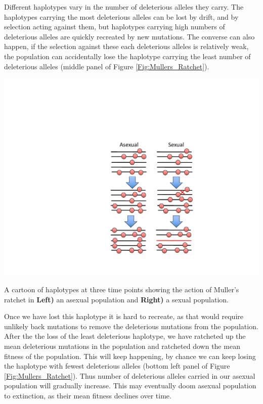 Different haplotypes vary in the number of deleterious alleles they carry. The haplotypes carrying the most deleterious alleles can be lost by drift, and by selection acting against them, but haplotypes carrying high numbers of deleterious alleles are quickly recreated by new mutations. The converse can also happen, if the selection against these each deleterious alleles is relatively weak, the population can accidentally lose the haplotype carrying the least number of deleterious alleles (middle panel of Figure \ref{Fig:Mullers_Ratchet}). \begin{marginfigure}[0cm]
\begin{center}
  \includegraphics[width = \textwidth]{figures/Mullers_Ratchet.pdf}
\end{center}
\caption{A cartoon of haplotypes at three time points showing the action of Muller's ratchet in {\bf Left)} an asexual population and {\bf Right)} a sexual population.} \label{Fig:Mullers_Ratchet}  
\end{marginfigure} Once we have lost this haplotype it is hard to recreate, as that would require unlikely back mutations to remove the deleterious mutations from the population. After the the loss of the least deleterious haplotype, we have ratcheted up the mean deleterious mutations in the population and ratcheted down the mean fitness of the population. This will keep happening, by chance we can keep losing the haplotype with fewest deleterious alleles (bottom left panel of Figure \ref{Fig:Mullers_Ratchet}). Thus number of deleterious alleles carried in our asexual population will gradually increase. This may eventually doom asexual population to extinction, as their mean fitness declines over time.

